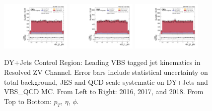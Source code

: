 \begin{figure}[!ht]
  \includegraphics[width=0.30\textwidth]{analysis_plots/2016_zjj/cr_vjets_l/vbf_j1_phi.pdf}
  \includegraphics[width=0.30\textwidth]{analysis_plots/2017_zjj/cr_vjets_l/vbf_j1_phi.pdf}
  \includegraphics[width=0.30\textwidth]{analysis_plots/2018_zjj/cr_vjets_l/vbf_j1_phi.pdf} \\
  \caption[DY+Jets Control Region: Leading VBS tagged jet kinematics in Resolved ZV Channel]%
  {DY+Jets Control Region: Leading VBS tagged jet kinematics in Resolved ZV Channel.
    Error bars include statistical uncertainty on total background,
    JES and QCD scale systematic on DY+Jets and VBS\_QCD MC\@. From Left to Right: 2016,
    2017, and 2018. From Top to Bottom: \( p_T \), \( \eta \), \( \phi \).}%
  \label{fig:zjj-cr-vjets-l-vbs1-pt-eta-m}
\end{figure}

